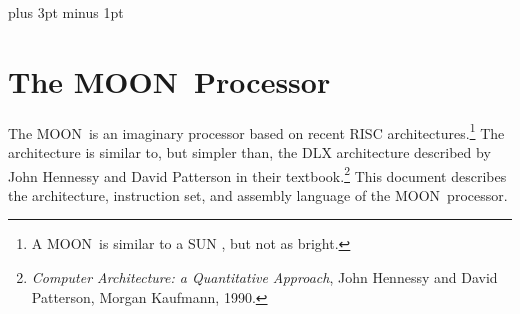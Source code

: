 

\textwidth     6.5in
\textheight      9in
\topmargin    -0.5in
\oddsidemargin   0in
\evensidemargin  0in
\parskip         5pt plus 3pt minus 1pt
\parindent       0pt

\newcommand{\luna}{{\sf LUNA}}
\newcommand{\moon}{{\sf MOON}}
\newcommand{\sun }{{\sf SUN }}

\newcommand{\xf}[1]{Figure~\ref{#1}}
\newcommand{\xs}[1]{Section~\ref{#1}}
\newcommand{\id}[1]{\mbox{\it #1\/}}
\newcommand{\kw}[1]{\mbox{\sf #1}}
\newcommand{\qt}[1]{``{\tt #1}''}
\newcommand{\cmt}{{\rm \%}}
\newcommand{\usc}{\underline{\hskip 1em}}
\newcommand{\bt}{$\bullet$}
\newcommand{\lr}{\mbox{$\longrightarrow$}}
\newcommand{\code}[1]{\langle#1\rangle}


\setcounter{secnumdepth}{3}

\newenvironment{prog}{\par\def\-{\qquad}\vspace{\parskip}%
\parskip0pt\leftskip2em\obeylines}{}

\newcommand{\bmem}[1]{{\cal M}_8[#1]}
\newcommand{\wmem}[1]{{\cal M}_{32}[#1]}
\newcommand{\breg}[2]{{\cal R}_{#1}(#2)}
\newcommand{\wreg}[1]{{\cal R}(#1)}
\newcommand{\ic}{\mbox{\it PC\/}}
\newcommand{\ass}[1]{\stackrel{#1}{\longleftarrow}}
\newcommand{\nont}[1]{\mbox{\sl #1\/}}
\newcommand{\ang}[1]{\langle\mbox{\it #1\/}\rangle}

\newenvironment{nolab}%
{\begin{list}{}{\topsep 0pt plus 3pt \labelsep 0.5em%
\leftmargin 2em \parsep0.5ex \itemsep 0ex}}%
{\end{list}}

\pagestyle{headings}



\section{The \moon\ Processor}

The \moon\ is an imaginary processor based on recent RISC
architectures.\footnote{A \moon\ is similar to a \sun, but not as
bright.} The architecture is similar to, but simpler than, the DLX
architecture described by John Hennessy and David Patterson in their
textbook.\footnote{{\it Computer Architecture: a Quantitative
Approach\/}, John Hennessy and David Patterson, Morgan Kaufmann, 1990.}
This document describes the architecture, instruction set, and assembly
language of the \moon\ processor.

